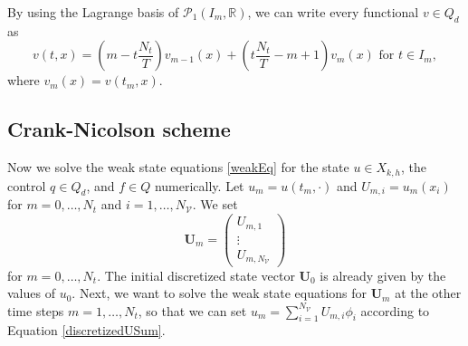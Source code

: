 By using the Lagrange basis of $\mathcal{P}_1(I_m,\mathbb{R})$, we can write every functional $v \in Q_d$ as
\begin{equation}
\label{discretizeVariableInTime}
v(t,x)=\left(m-t\frac{N_t}{T}\right) v_{m-1}(x)+\left(t\frac{N_t}{T}-m+1\right) v_m(x)\text{ for }t\in I_m,
\end{equation}
where $v_m(x)=v(t_m,x)$.


\subsection{Crank-Nicolson scheme}
Now we solve the weak state equations \eqref{weakEq} for the state $u\in X_{k,h}$, the control $q\in Q_d$, and $f\in Q$ numerically. Let $u_m=u(t_m, \cdot)$ and $U_{m,i}=u_m(x_i)$ for $m=0,\dotsc,N_t$ and $i=1,\dotsc,N_\mathcal{V}$. We set
\begin{displaymath}
\mathbf{U}_m=\begin{pmatrix} U_{m,1} \\ \vdots \\ U_{m,N_\mathcal{V}} \end{pmatrix}
\end{displaymath}
for $m=0,\dotsc,N_t$. The initial discretized state vector $\mathbf{U}_0$ is already given by the values of $u_0$. Next, we want to solve the weak state equations for $\mathbf{U}_m$ at the other time steps $m=1,\dotsc,N_t$, so that we can set $u_m=\sum_{i=1}^{N_\mathcal{V}}U_{m,i}\phi_i$ according to Equation \eqref{discretizedUSum}.

